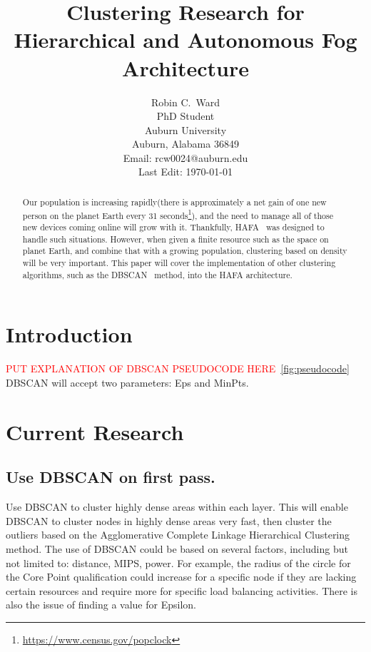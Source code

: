 \documentclass[letterpaper,twocolumn,10pt]{article}
\newcommand\todo[1]{\textcolor{red}{#1}}
\begin{document}
\title{\Large \bf Clustering Research for Hierarchical and Autonomous Fog Architecture}

\author{
{\rm Robin C.\ Ward}\\
PhD Student\\
Auburn University\\
Auburn, Alabama 36849\\
Email: rcw0024@auburn.edu\\
Last Edit: \today
}

\maketitle

\begin{abstract}
Our population is increasing rapidly(there is approximately a net gain of one new person on the planet Earth every 31 seconds\footnote{\url{https://www.census.gov/popclock}}), and the need to manage all of those new devices coming online will grow with it. Thankfully, HAFA~\cite{10.1145/3229710.3229740} was designed to handle such situations. However, when given a finite resource such as the space on planet Earth, and combine that with a growing population, clustering based on density will be very important. This paper will cover the implementation of other clustering algorithms, such as the DBSCAN~\cite{10.5555/3001460.3001507} method, into the HAFA architecture.
\end{abstract}

\section{Introduction}
\todo{PUT EXPLANATION OF DBSCAN PSEUDOCODE HERE}~\ref{fig:pseudocode}
DBSCAN will accept two parameters: Eps and MinPts.

\section{Current Research}
\subsection{Use DBSCAN on first pass.}
Use DBSCAN to cluster highly dense areas within each layer. This will enable DBSCAN to cluster nodes in highly dense areas very fast, then cluster the outliers based on the Agglomerative Complete Linkage Hierarchical Clustering method. The use of DBSCAN could be based on several factors, including but not limited to: distance, MIPS, power. For example, the radius of the circle for the Core Point qualification could increase for a specific node if they are lacking certain resources and require more for specific load balancing activities. There is also the issue of finding a value for Epsilon.
\end{document}
